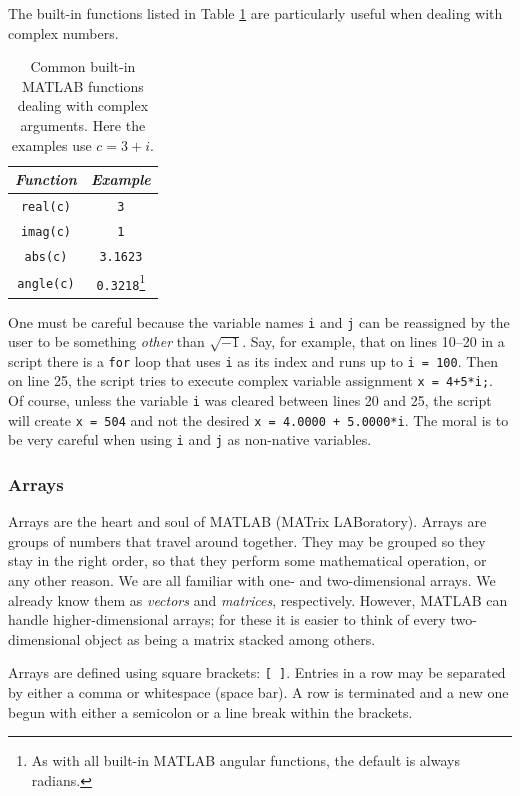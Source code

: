 The built-in functions listed in Table \ref{tab.complexnumfuncs} are particularly useful when dealing with complex numbers.
\begin{table}[hbt]
\begin{minipage}{\textwidth}
\centering
\begin{tabular}{c|c}
    \textit{Function}   &   \textit{Example} \\ \hline\hline
    \verb=real(c)=      &   \verb=3=        \\
    \verb=imag(c)=      &   \verb=1=        \\
    \verb=abs(c)=       &   \verb=3.1623=    \\
    \verb=angle(c)=     &   \verb=0.3218=\footnote{As with all built-in MATLAB angular functions, the default is always radians.}
\end{tabular}
\caption[Common Complex Number Functions]{\footnotesize
        Common built-in MATLAB functions dealing with complex arguments.  Here the examples use $c=3+i$.
        \label{tab.complexnumfuncs}
        }
\end{minipage}
\end{table}

\par
One must be careful because the variable names \verb=i= and \verb=j= can be reassigned by the user to be something \textit{other} than $\sqrt{-1}$.  Say, for example, that on lines 10--20 in a script there is a \verb=for= loop that uses \verb=i= as its index and runs up to \verb#i = 100#.  Then on line 25, the script tries to execute complex variable assignment \verb#x = 4+5*i;#.  Of course, unless the variable \verb=i= was cleared between lines 20 and 25, the script will create \verb#x = 504# and not the desired \verb#x = 4.0000 + 5.0000*i#.  The moral is to be very careful when using \verb=i= and \verb=j= as non-native variables.

\subsubsection{Arrays} \label{sec.matlab.array}
Arrays are the heart and soul of MATLAB (MATrix LABoratory).  Arrays are groups of numbers that travel around together.  They may be grouped so they stay in the right order, so that they perform some mathematical operation, or any other reason.  We are all familiar with one- and two-dimensional arrays.  We already know them as \textit{vectors} and \textit{matrices}, respectively.  However, MATLAB can handle higher-dimensional arrays; for these it is easier to think of every two-dimensional object as being a matrix stacked among others.
\par
Arrays are defined using square brackets: \verb=[ ]=.  Entries in a row may be separated by either a comma or whitespace (space bar).  A row is terminated and a new one begun with either a semicolon or a line break within the brackets.

